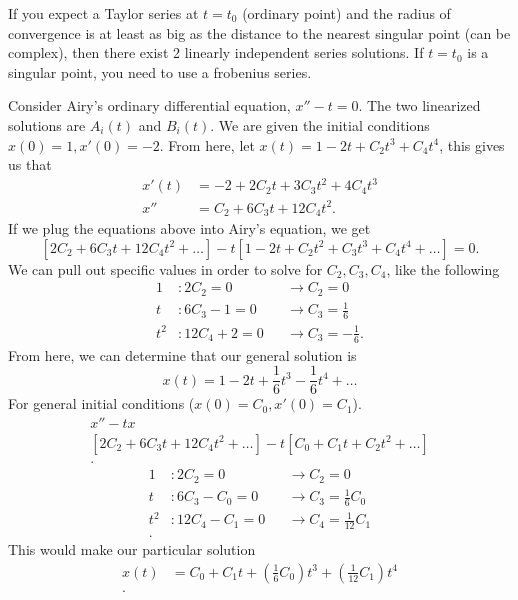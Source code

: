 \begin{theorem}
  If you expect a Taylor series at $t=t_0$ (ordinary point) and the radius of convergence is at least as big as the distance to the nearest singular point (can be complex), then there exist 2 linearly independent series solutions. If $t=t_0$ is a singular point, you need to use a frobenius series.
\end{theorem}
\begin{eg}
  Consider Airy's ordinary differential equation, $x''-t=0$. The two linearized solutions are $A_i(t)$ and $B_i(t)$. We are given the initial conditions $x(0)=1,x'(0)=-2$. From here, let $x(t)=1-2t+C_2t^3+C_4t^{4}$, this gives us that 
  \begin{align*}
    x'(t)&=-2+2C_2t+3C_3t^2+4C_4t^3\\
    x''&=C_2+6C_3t+12C_4t^2
  .\end{align*}
  If we plug the equations above into Airy's equation, we get
  \[
  \left[ 2C_2+6C_3t+12C_4t^2+\ldots \right]-t\left[ 1-2t+C_2t^2+C_3t^3+C_4t ^{4}+\ldots \right] =0
  .\] 
  We can pull out specific values in order to solve for $C_2,C_3,C_4$, like the following 
  \begin{align*}
    1&:2C_2=0 &&\to C_2=0\\
    t&:6C_3-1=0&&\to C_3=\frac{1}{6}\\
    t^2&:12C_4+2=0&&\to C_3=-\frac{1}{6}
  .\end{align*}
  From here, we can determine that our general solution is 
  \begin{equation*}
    \boxed{x(t)=1-2t+\frac{1}{6}t^3-\frac{1}{6}t ^{4}+\ldots}
  \end{equation*}
  For general initial conditions ($x(0)=C_0, x'(0)=C_1$).
  \begin{align*}
    x''-tx\\
    [2C_2+6C_3t+12C_4t^2+\ldots]-t[C_0+C_1t+C_2t^2+\ldots]\\
  .\end{align*}
  \begin{align*}
    1&:2C_2=0&&\to C_2=0\\
    t&:6C_3-C_0=0&&\to C_3=\frac{1}{6}C_0\\
    t^2&:12C_4-C_1=0&&\to C_4=\frac{1}{12}C_1\\
  .\end{align*}
  This would make our particular solution 
  \begin{align*}
    x(t)&=C_0+C_1t+\left( \frac{1}{6}C_0 \right) t^3+\left( \frac{1}{12}C_1 \right) t ^{4}\\
  .\end{align*}
\end{eg}

